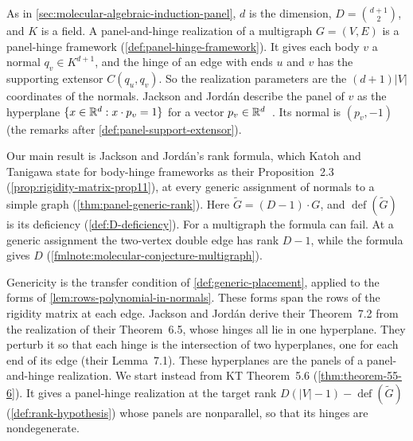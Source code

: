 As in \cref{sec:molecular-algebraic-induction-panel}, $d$ is the
dimension, $D = \binom{d+1}{2}$, and $K$ is a field. A
panel-and-hinge realization of a multigraph $G = (V, E)$ is a
panel-hinge framework (\cref{def:panel-hinge-framework}). It gives
each body $v$ a normal $q_v \in K^{d+1}$, and the hinge of an edge
with ends $u$ and $v$ has the supporting extensor $C(q_u, q_v)$. So
the realization parameters are the $(d+1)|V|$ coordinates of the
normals. Jackson and Jord\'an describe the panel of $v$ as the
hyperplane $\{x \in {\mathbb{R}}^d : x \cdot p_v = 1\}$ for a vector
$p_v \in {\mathbb{R}}^d$~\cite[\S7]{jacksonJordan2009}. Its normal is
$(p_v, -1)$ (the remarks after \cref{def:panel-support-extensor}).

Our main result is Jackson and Jord\'an's rank formula, which Katoh
and Tanigawa state for body-hinge frameworks as their Proposition~2.3
(\cref{prop:rigidity-matrix-prop11}), at every generic assignment of
normals to a simple graph
(\cref{thm:panel-generic-rank}). Here $\tilde G = (D-1) \cdot G$, and
$\operatorname{def}(\tilde G)$ is its deficiency
(\cref{def:D-deficiency}). For a multigraph the formula can fail. At a
generic assignment the two-vertex double edge has rank $D - 1$, while
the formula gives $D$ (\cref{fmlnote:molecular-conjecture-multigraph}).

Genericity is the transfer condition of \cref{def:generic-placement},
applied to the forms of \cref{lem:rows-polynomial-in-normals}. These
forms span the rows of the rigidity matrix at each edge. Jackson and
Jord\'an derive their Theorem~7.2 from the realization of their
Theorem~6.5, whose hinges all lie in one hyperplane. They perturb it
so that each hinge is the intersection of two hyperplanes, one for each
end of its edge (their Lemma~7.1). These hyperplanes are the panels of
a panel-and-hinge realization. We start instead from KT Theorem~5.6
(\cref{thm:theorem-55-6}). It gives a panel-hinge realization at the
target rank $D(|V|-1) - \operatorname{def}(\tilde G)$
(\cref{def:rank-hypothesis}) whose panels are nonparallel, so that its
hinges are nondegenerate.

